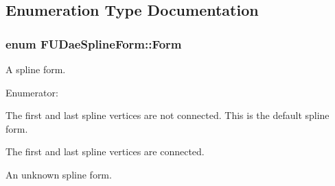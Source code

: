 \subsection{Enumeration Type Documentation}
\hypertarget{namespaceFUDaeSplineForm_a03b0ace2ce34dd4e28a14343d6aca88d}{
\subsubsection[{Form}]{\setlength{\rightskip}{0pt plus 5cm}enum {\bf FUDaeSplineForm::Form}}}
\label{namespaceFUDaeSplineForm_a03b0ace2ce34dd4e28a14343d6aca88d}
A spline form. \begin{Desc}
\item[Enumerator: ]\par
\begin{description}
\item[{\em 
\hypertarget{namespaceFUDaeSplineForm_a03b0ace2ce34dd4e28a14343d6aca88da4448741a6e3b8f04ab4e88c797279cd2}{
OPEN}
\label{namespaceFUDaeSplineForm_a03b0ace2ce34dd4e28a14343d6aca88da4448741a6e3b8f04ab4e88c797279cd2}
}]The first and last spline vertices are not connected. This is the default spline form. \item[{\em 
\hypertarget{namespaceFUDaeSplineForm_a03b0ace2ce34dd4e28a14343d6aca88da68c7c6f35e67d39527283dda1a128a98}{
CLOSED}
\label{namespaceFUDaeSplineForm_a03b0ace2ce34dd4e28a14343d6aca88da68c7c6f35e67d39527283dda1a128a98}
}]The first and last spline vertices are connected. \item[{\em 
\hypertarget{namespaceFUDaeSplineForm_a03b0ace2ce34dd4e28a14343d6aca88da310e325ede25d387212f1b93a187162b}{
UNKNOWN}
\label{namespaceFUDaeSplineForm_a03b0ace2ce34dd4e28a14343d6aca88da310e325ede25d387212f1b93a187162b}
}]An unknown spline form. \end{description}
\end{Desc}



